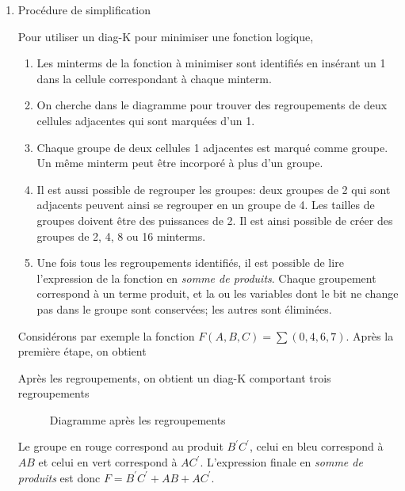 \documentclass[letter, oneside]{book}
\begin{document}
\begin{enumerate}
\item Procédure de simplification
\label{sec:orgd2cd1c6}

Pour utiliser un diag-K pour minimiser une fonction logique, 

\begin{enumerate}
\item Les minterms de la fonction à minimiser sont identifiés en insérant
un 1 dans la cellule correspondant à chaque minterm.
\item On cherche dans le diagramme pour trouver des regroupements de deux
cellules adjacentes qui sont marquées d'un 1.
\item Chaque groupe de deux cellules 1 adjacentes est marqué comme
groupe. Un même minterm peut être incorporé à plus d'un groupe.
\item Il est aussi possible de regrouper les groupes: deux groupes de 2
qui sont adjacents peuvent ainsi se regrouper en un groupe
de 4. Les tailles de groupes doivent être des puissances de 2. Il
est ainsi possible de créer des groupes de 2, 4, 8 ou 16 minterms.
\item Une fois tous les regroupements identifiés, il est possible de lire
l'expression de la fonction en \emph{somme de produits}. Chaque groupement
correspond à un terme produit, et la ou les variables dont le bit ne
change pas dans le groupe sont conservées; les autres sont
éliminées.
\end{enumerate}

Considérons par exemple la fonction \(F(A,B,C) = \sum (0, 4, 6,
7)\). Après la première étape, on obtient

\begin{center}

\label{orgf3deb2d}
\end{center}

Après les regroupements, on obtient un diag-K comportant trois regroupements

\begin{figure}[htbp]
\centering

\caption{\label{fig:orgc6f7ea5}Diagramme après les regroupements}
\end{figure}

Le groupe en rouge correspond au produit \(B^\prime C^\prime\), celui
en bleu correspond à \(A B\) et celui en vert correspond à \(A
C^\prime\). L'expression finale en \emph{somme de produits} est donc \(F =
B^\prime C^\prime + A B + A C^\prime\).


\end{enumerate}
\end{document}
